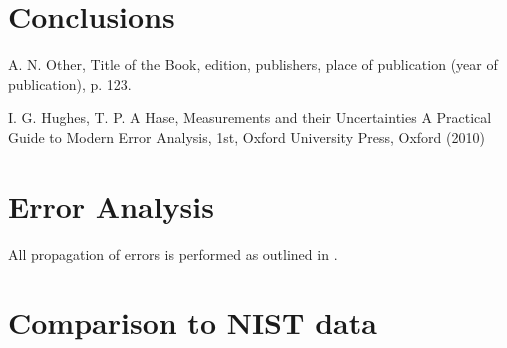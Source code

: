 \documentclass[10pt, twocolumn]{revtex4}    %
\begin{document}
\section{Conclusions} \label{s:conclusions}

\begin{thebibliography}{}

 A. N. Other, Title of the Book, edition, publishers, place of publication (year of publication), p. 123.   %

I. G. Hughes, T. P. A Hase, Measurements and their Uncertainties A Practical Guide to Modern Error Analysis, 1st, Oxford University Press, Oxford (2010)

\end{thebibliography} 

\clearpage
\appendix
\section{Error Analysis} \label{a:errors}
All propagation of errors is performed as outlined in \cite{errors}.

\clearpage
\section{Comparison to NIST data} \label{a:NIST}
\end{document}
